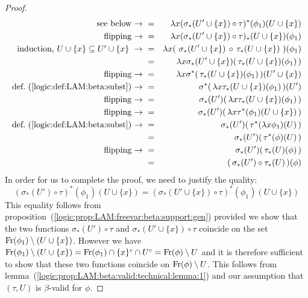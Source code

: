 \begin{proof}
\begin{eqnarray*}
            \mbox{see below\ $\to$\ }
            &=&\lambda x(\sigma_{*}(U'\cup\{x\})\circ
                         \tau)^{*}(\phi_{1})(U\cup\{x\})\\
            \mbox{flipping\ $\to$\ }
            &=&\lambda x(\sigma_{*}(U'\cup\{x\})\circ
                         \tau)_{*}(U\cup\{x\})(\phi_{1})\\
            \mbox{induction, $U\cup\{x\}\subseteq U'\cup\{x\}\ \to\ $}
            &=&\lambda x(\ \sigma_{*}(U'\cup\{x\})\,\circ\,
                           \tau_{*}(U\cup\{x\})\ )(\phi_{1})\\
            &=&\lambda x \sigma_{*}(U'\cup\{x\})(\,
                         \tau_{*}(U\cup\{x\})(\phi_{1})\,)\\
            \mbox{flipping\ $\to$\ }
            &=&\lambda x \sigma^{*}(\,\tau_{*}(U\cup\{x\})(\phi_{1})\,)
                         (U'\cup\{x\})\\
            \mbox{def.~(\ref{logic:def:LAM:beta:subst})\ $\to$\ }
            &=&\sigma^{*}(\,\lambda x\tau_{*}(U\cup\{x\})(\phi_{1})\,)(U')\\
            \mbox{flipping\ $\to$\ }
            &=&\sigma_{*}(U')(\,\lambda x\tau_{*}(U\cup\{x\})(\phi_{1})\,)\\
            \mbox{flipping\ $\to$\ }
            &=&\sigma_{*}(U')(\,\lambda x\tau^{*}(\phi_{1})(U\cup\{x\})\,)\\
            \mbox{def.~(\ref{logic:def:LAM:beta:subst})\ $\to$\ }
            &=&\sigma_{*}(U')(\,\tau^{*}(\lambda x\phi_{1})(U)\,)\\
            &=&\sigma_{*}(U')(\,\tau^{*}(\phi)(U)\,)\\
            \mbox{flipping\ $\to$\ }
            &=&\sigma_{*}(U')(\,\tau_{*}(U)(\phi)\,)\\
            &=&(\,\sigma_{*}(U')\circ\tau_{*}(U)\,)(\phi)
        \end{eqnarray*}
    In order for us to complete the proof, we need to justify the quality:
        \[
            (\sigma_{*}(U')\circ\tau)^{*}(\phi_{1})(U\cup\{x\})
            =
            (\sigma_{*}(U'\cup\{x\})\circ\tau)^{*}(\phi_{1})(U\cup\{x\})
        \]
    This equality follows from 
    proposition~(\ref{logic:prop:LAM:freevar:beta:support:gen}) provided
    we show that the two functions $\sigma_{*}(U')\circ\tau$ and
    $\sigma_{*}(U'\cup\{x\})\circ\tau$ coincide on the set $\mbox{\rm Fr}(\phi_{1})
    \setminus(U\cup\{x\})$. However we have $\mbox{\rm Fr}(\phi_{1})\setminus(U
    \cup\{x\}) =\mbox{\rm Fr}(\phi_{1})\cap \{x\}^{c}\cap U^{c}= \mbox{\rm Fr}(\phi)\setminus U$
    and it is therefore sufficient to show that these two functions
    coincide on $\mbox{\rm Fr}(\phi)\setminus U$. This follows from
    lemma~(\ref{logic:prop:LAM:beta:valid:technical:lemma:1}) and our
    assumption that $(\tau,U)$ is $\beta$-valid for $\phi$.
\end{proof}

